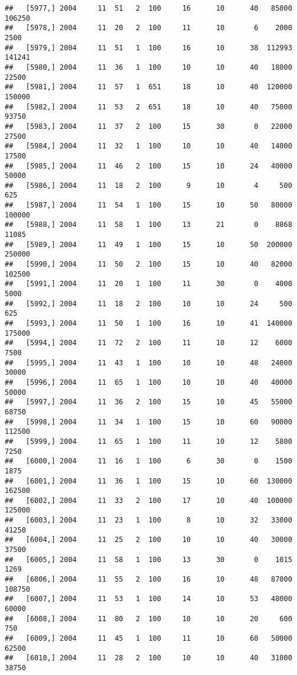 \documentclass{article}\usepackage[]{graphicx}\usepackage[]{color}
\makeatletter
\newenvironment{kframe}{%
 \def\at@end@of@kframe{}%
 \ifinner\ifhmode%
  \def\at@end@of@kframe{\end{minipage}}%
  \begin{minipage}{\columnwidth}%
 \fi\fi%
 \def\FrameCommand##1{\hskip\@totalleftmargin \hskip-\fboxsep
 \colorbox{shadecolor}{##1}\hskip-\fboxsep
     \hskip-\linewidth \hskip-\@totalleftmargin \hskip\columnwidth}%
 \MakeFramed {\advance\hsize-\width
   \@totalleftmargin\z@ \linewidth\hsize
   \@setminipage}}%
 {\par\unskip\endMakeFramed%
 \at@end@of@kframe}
\newenvironment{knitrout}{}{} %
\makeatother
\begin{document}
\begin{knitrout}
\begin{kframe}
\begin{verbatim}
##   [5977,] 2004     11  51   2  100     16      10      40   85000  106250
##   [5978,] 2004     11  20   2  100     11      10       6    2000    2500
##   [5979,] 2004     11  51   1  100     16      10      38  112993  141241
##   [5980,] 2004     11  36   1  100     10      10      40   18000   22500
##   [5981,] 2004     11  57   1  651     18      10      40  120000  150000
##   [5982,] 2004     11  53   2  651     18      10      40   75000   93750
##   [5983,] 2004     11  37   2  100     15      30       0   22000   27500
##   [5984,] 2004     11  32   1  100     10      10      40   14000   17500
##   [5985,] 2004     11  46   2  100     15      10      24   40000   50000
##   [5986,] 2004     11  18   2  100      9      10       4     500     625
##   [5987,] 2004     11  54   1  100     15      10      50   80000  100000
##   [5988,] 2004     11  58   1  100     13      21       0    8868   11085
##   [5989,] 2004     11  49   1  100     15      10      50  200000  250000
##   [5990,] 2004     11  50   2  100     15      10      40   82000  102500
##   [5991,] 2004     11  20   1  100     11      30       0    4000    5000
##   [5992,] 2004     11  18   2  100     10      10      24     500     625
##   [5993,] 2004     11  50   1  100     16      10      41  140000  175000
##   [5994,] 2004     11  72   2  100     11      10      12    6000    7500
##   [5995,] 2004     11  43   1  100     10      10      48   24000   30000
##   [5996,] 2004     11  65   1  100     10      10      40   40000   50000
##   [5997,] 2004     11  36   2  100     15      10      45   55000   68750
##   [5998,] 2004     11  34   1  100     15      10      60   90000  112500
##   [5999,] 2004     11  65   1  100     11      10      12    5800    7250
##   [6000,] 2004     11  16   1  100      6      30       0    1500    1875
##   [6001,] 2004     11  36   1  100     15      10      60  130000  162500
##   [6002,] 2004     11  33   2  100     17      10      40  100000  125000
##   [6003,] 2004     11  23   1  100      8      10      32   33000   41250
##   [6004,] 2004     11  25   2  100     10      10      40   30000   37500
##   [6005,] 2004     11  58   1  100     13      30       0    1015    1269
##   [6006,] 2004     11  55   2  100     16      10      48   87000  108750
##   [6007,] 2004     11  53   1  100     14      10      53   48000   60000
##   [6008,] 2004     11  80   2  100     10      10      20     600     750
##   [6009,] 2004     11  45   1  100     11      10      60   50000   62500
##   [6010,] 2004     11  28   2  100     10      10      40   31000   38750

\end{verbatim}
\end{kframe}
\end{knitrout}
\end{document}
